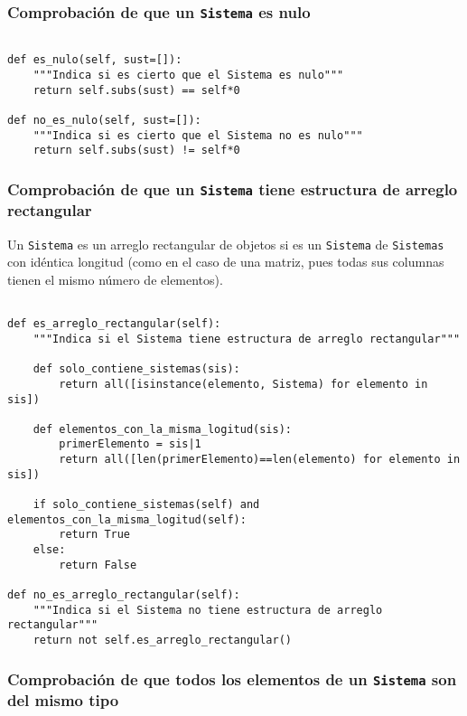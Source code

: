 \documentclass[11pt]{report}
\begin{document}
\subsubsection{Comprobación de que un \texttt{Sistema} es nulo}
\label{sec:org25b4d28}

\begin{verbatim}

def es_nulo(self, sust=[]):
    """Indica si es cierto que el Sistema es nulo"""
    return self.subs(sust) == self*0

def no_es_nulo(self, sust=[]):
    """Indica si es cierto que el Sistema no es nulo"""
    return self.subs(sust) != self*0

\end{verbatim}

\subsubsection{Comprobación de que un \texttt{Sistema}  tiene estructura de arreglo rectangular}
\label{sec:org3debff8}

Un \texttt{Sistema} es un arreglo rectangular de objetos si es un \texttt{Sistema}
de \texttt{Sistemas} con idéntica longitud (como en el caso de una matriz,
pues todas sus columnas tienen el mismo número de elementos).
\begin{verbatim}

def es_arreglo_rectangular(self):
    """Indica si el Sistema tiene estructura de arreglo rectangular"""

    def solo_contiene_sistemas(sis):
        return all([isinstance(elemento, Sistema) for elemento in sis])

    def elementos_con_la_misma_logitud(sis):
        primerElemento = sis|1
        return all([len(primerElemento)==len(elemento) for elemento in sis])

    if solo_contiene_sistemas(self) and elementos_con_la_misma_logitud(self):
        return True
    else:
        return False

def no_es_arreglo_rectangular(self):
    """Indica si el Sistema no tiene estructura de arreglo rectangular"""
    return not self.es_arreglo_rectangular()

\end{verbatim}

\subsubsection{Comprobación de que todos los elementos de un \texttt{Sistema} son del mismo tipo}
\label{sec:org0b3f1bd}
\end{document}
